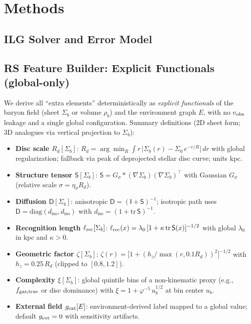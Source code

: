 \documentclass[fleqn,usenatbib]{mnras}
\begin{document}
\section{Methods}

\subsection{ILG Solver and Error Model}
\subsection{RS Feature Builder: Explicit Functionals (global-only)}
\noindent We derive all “extra elements” deterministically as \emph{explicit functionals} of the baryon field (sheet $\Sigma_b$ or volume $\rho_b$) and the environment graph $E$, with no $v_{\rm obs}$ leakage and a single global configuration. Summary definitions (2D sheet form; 3D analogues via vertical projection to $\Sigma_b$):
\begin{itemize}
  \item \textbf{Disc scale $R_d[\Sigma_b]$}: $R_d=\arg\min_{R} \int r\,\bigl|\Sigma_b(r)-\Sigma_0\,e^{-r/R}\bigr|\,dr$ with global regularization; fallback via peak of deprojected stellar disc curve; units kpc.
  \item \textbf{Structure tensor $\mathsf S[\Sigma_b]$}: $\mathsf S = G_{\sigma}\!\ast (\nabla \Sigma_b)(\nabla \Sigma_b)^{\!\top}$ with Gaussian $G_{\sigma}$ (relative scale $\sigma=\eta_\sigma R_d$).
  \item \textbf{Diffusion $\mathsf D[\Sigma_b]$}: anisotropic $\mathsf D=(\mathsf I+\mathsf S)^{-1}$; isotropic path uses $\mathsf D=\mathrm{diag}(d_\mathrm{iso},d_\mathrm{iso})$ with $d_\mathrm{iso}=(1+\mathrm{tr}\,\mathsf S)^{-1}$.
  \item \textbf{Recognition length $\ell_{\rm rec}[\Sigma_b]$}: $\ell_{\rm rec}(x)=\lambda_0\,[1+\kappa\,\mathrm{tr}\,\mathsf S(x)]^{-1/2}$ with global $\lambda_0$ in kpc and $\kappa>0$.
  \item \textbf{Geometric factor $\zeta[\Sigma_b]$}: $\zeta(r)=\bigl[1+(h_z/\max(r,0.1R_d))^2\bigr]^{-1/2}$ with $h_z=0.25\,R_d$ (clipped to $[0.8,1.2]$).
  \item \textbf{Complexity $\xi[\Sigma_b]$}: global quintile bins of a non-kinematic proxy (e.g., $f_{\rm gas,true}$ or disc dominance) with $\xi=1+\varphi^{-5}\,u_b^{1/2}$ at bin center $u_b$.
  \item \textbf{External field $g_{\rm ext}[E]$}: environment-derived label mapped to a global value; default $g_{\rm ext}=0$ with sensitivity artifacts.
\end{itemize}
\end{document}
